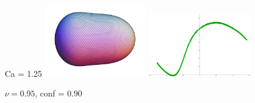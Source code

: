 \documentclass[12pt]{article}
\numberwithin{equation}{section}
\begin{document}
\begin{figure}[h]
\begin{center}
	\\
	Ca = 1.25 
	\includegraphics[width=0.4\textwidth]{shape/shape_vred95_conf90_v1eb05}
	\includegraphics[width=0.4\textwidth]{tension/tension_vred95_conf90_v1eb05}
\caption{$\nu = 0.95$, conf = 0.90}
\end{center}
\end{figure}
\end{document}
